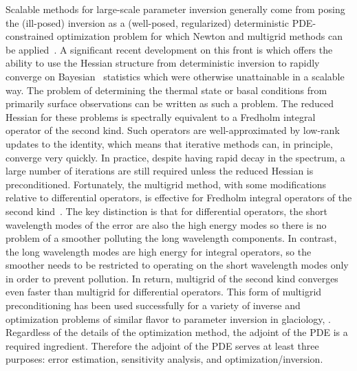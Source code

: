 Scalable methods for large-scale parameter inversion generally come from posing the (ill-posed) inversion as a (well-posed, regularized) deterministic PDE-constrained optimization problem for which Newton and multigrid methods can be applied~\citep{biros2005pln1,biros2005pln2,akcelik2006parallel}.
A significant recent development on this front is \citet{akcelik2011fast} which offers the ability to use the Hessian structure from deterministic inversion to rapidly converge on Bayesian~\citep{tarantola2005ipt} statistics which were otherwise unattainable in a scalable way.
The problem of determining the thermal state or basal conditions from primarily surface observations can be written as such a problem.
The reduced Hessian for these problems is spectrally equivalent to a Fredholm integral operator of the second kind.
Such operators are well-approximated by low-rank updates to the identity, which means that iterative methods can, in principle, converge very quickly.
In practice, despite having rapid decay in the spectrum, a large number of iterations are still required unless the reduced Hessian is preconditioned.
Fortunately, the multigrid method, with some modifications relative to differential operators, is effective for Fredholm integral operators of the second kind~\citep{hackbusch1985multi}.
The key distinction is that for differential operators, the short wavelength modes of the error are also the high energy modes so there is no problem of a smoother polluting the long wavelength components.
In contrast, the long wavelength modes are high energy for integral operators, so the smoother needs to be restricted to operating on the short wavelength modes only in order to prevent pollution.
In return, multigrid of the second kind converges even faster than multigrid for differential operators.
This form of multigrid preconditioning has been used successfully for a variety of inverse and optimization problems of similar flavor to parameter inversion in glaciology, \citep{akcelik2005ddd,biros2008multilevel,rees2010optimal}.
Regardless of the details of the optimization method, the adjoint of the PDE is a required ingredient.
Therefore the adjoint of the PDE serves at least three purposes: error estimation, sensitivity analysis, and optimization/inversion.

